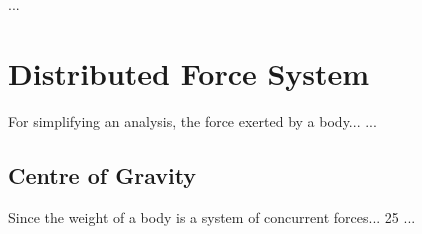 \documentclass[a4paper,twoside]{book}
\begin{document}
 ...
\chapter{Distributed Force System}
\thispagestyle{empty}
For simplifying an analysis, the force exerted by a body...
...
\section{Centre of Gravity}
Since the weight of a body is a system of concurrent forces... 25 ...
\end{document}
